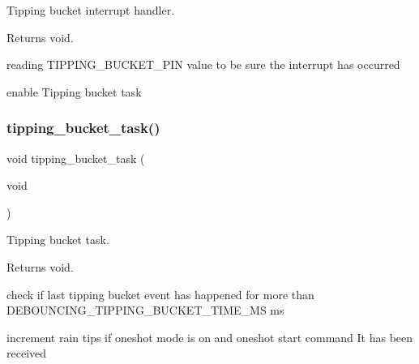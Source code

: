 Tipping bucket interrupt handler. 

\begin{DoxyReturn}{Returns}
void. 
\end{DoxyReturn}
reading T\+I\+P\+P\+I\+N\+G\+\_\+\+B\+U\+C\+K\+E\+T\+\_\+\+P\+IN value to be sure the interrupt has occurred

enable Tipping bucket task \mbox{\label{i2c-rain_8ino_a009edfb36e6432603ed0ede845e2c12d}} 
\subsubsection{\texorpdfstring{tipping\+\_\+bucket\+\_\+task()}{tipping\_bucket\_task()}}
{\footnotesize\ttfamily void tipping\+\_\+bucket\+\_\+task (\begin{DoxyParamCaption}\item[{void}]{ }\end{DoxyParamCaption})}



Tipping bucket task. 

\begin{DoxyReturn}{Returns}
void. 
\end{DoxyReturn}
check if last tipping bucket event has happened for more than D\+E\+B\+O\+U\+N\+C\+I\+N\+G\+\_\+\+T\+I\+P\+P\+I\+N\+G\+\_\+\+B\+U\+C\+K\+E\+T\+\_\+\+T\+I\+M\+E\+\_\+\+MS ms

increment rain tips if oneshot mode is on and oneshot start command It has been received 